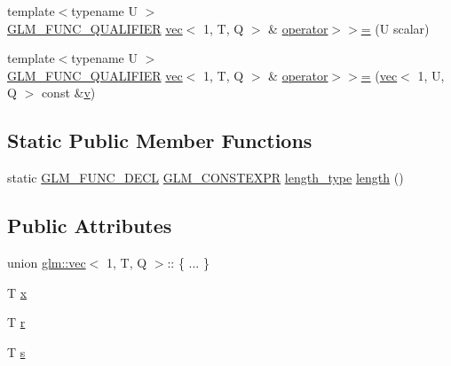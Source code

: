 \begin{DoxyCompactItemize}
\item 
{\footnotesize template$<$typename U $>$ }\\\hyperlink{setup_8hpp_a33fdea6f91c5f834105f7415e2a64407}{G\+L\+M\+\_\+\+F\+U\+N\+C\+\_\+\+Q\+U\+A\+L\+I\+F\+I\+ER} \hyperlink{structglm_1_1vec}{vec}$<$ 1, T, Q $>$ \& \hyperlink{structglm_1_1vec_3_011_00_01_t_00_01_q_01_4_afe1c0569bc10df48602abfda91892c98}{operator$>$$>$=} (U scalar)
\item 
{\footnotesize template$<$typename U $>$ }\\\hyperlink{setup_8hpp_a33fdea6f91c5f834105f7415e2a64407}{G\+L\+M\+\_\+\+F\+U\+N\+C\+\_\+\+Q\+U\+A\+L\+I\+F\+I\+ER} \hyperlink{structglm_1_1vec}{vec}$<$ 1, T, Q $>$ \& \hyperlink{structglm_1_1vec_3_011_00_01_t_00_01_q_01_4_a5f338e27a69533420079adc1daaab092}{operator$>$$>$=} (\hyperlink{structglm_1_1vec}{vec}$<$ 1, U, Q $>$ const \&\hyperlink{_s_d_l__opengl_8h_a10a82eabcb59d2fcd74acee063775f90}{v})
\end{DoxyCompactItemize}
\subsection*{Static Public Member Functions}
\begin{DoxyCompactItemize}
\item 
static \hyperlink{setup_8hpp_ab2d052de21a70539923e9bcbf6e83a51}{G\+L\+M\+\_\+\+F\+U\+N\+C\+\_\+\+D\+E\+CL} \hyperlink{setup_8hpp_a08b807947b47031d3a511f03f89645ad}{G\+L\+M\+\_\+\+C\+O\+N\+S\+T\+E\+X\+PR} \hyperlink{structglm_1_1vec_3_011_00_01_t_00_01_q_01_4_a37415eee3b59cf93cdb752a2b30fe5e6}{length\+\_\+type} \hyperlink{structglm_1_1vec_3_011_00_01_t_00_01_q_01_4_a225b4ffa0391c3f0c64d1b43cf7a662d}{length} ()
\end{DoxyCompactItemize}
\subsection*{Public Attributes}
\begin{DoxyCompactItemize}
\item 
union \hyperlink{structglm_1_1vec}{glm\+::vec}$<$ 1, T, Q $>$\+:: \{ ... \}  
\item 
T \hyperlink{structglm_1_1vec_3_011_00_01_t_00_01_q_01_4_a81767d72ae05f8cf2e904cc16ce924a2}{x}
\item 
T \hyperlink{structglm_1_1vec_3_011_00_01_t_00_01_q_01_4_ad023565c535d96362539e4a4a21eb34c}{r}
\item 
T \hyperlink{structglm_1_1vec_3_011_00_01_t_00_01_q_01_4_a8369797bacdb23e8720d4967e1cd5af8}{s}
\end{DoxyCompactItemize}


